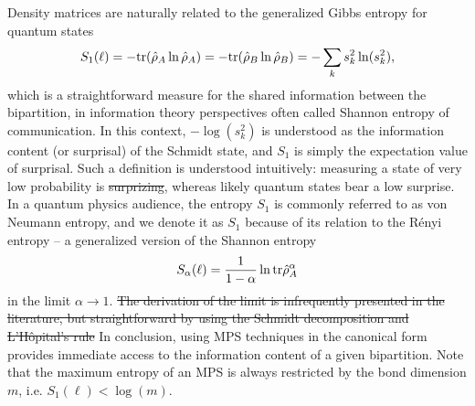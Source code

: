 \documentclass{svmono}
\def\re{\mathrm e}
\def\tr{{\rm tr}}
\providecommand{\DIFaddtex}[1]{{\protect\color{blue}\uwave{#1}}} %
\providecommand{\DIFdeltex}[1]{{\protect\color{red}\sout{#1}}}                      %
\providecommand{\DIFaddbegin}{} %
\providecommand{\DIFaddend}{} %
\providecommand{\DIFdelbegin}{} %
\providecommand{\DIFdelend}{} %
\providecommand{\DIFadd}[1]{\texorpdfstring{\DIFaddtex{#1}}{#1}} %
\providecommand{\DIFdel}[1]{\texorpdfstring{\DIFdeltex{#1}}{}} %
\newcommand{\DIFscaledelfig}{0.5}
\newlength{\DIFdelgraphicswidth} %
\newlength{\DIFdelgraphicsheight} %
\newcommand{\DIFaddincludegraphics}[2][]{{\color{blue}\fbox{\DIFOincludegraphics[#1]{#2}}}} %
\newcommand{\DIFdelincludegraphics}[2][]{%
\sbox{\DIFdelgraphicsbox}{\DIFOincludegraphics[#1]{#2}}%
\settoboxwidth{\DIFdelgraphicswidth}{\DIFdelgraphicsbox} %
\settoboxtotalheight{\DIFdelgraphicsheight}{\DIFdelgraphicsbox} %
\scalebox{\DIFscaledelfig}{%
\parbox[b]{\DIFdelgraphicswidth}{\usebox{\DIFdelgraphicsbox}\\[-\baselineskip] \rule{\DIFdelgraphicswidth}{0em}}\llap{\resizebox{\DIFdelgraphicswidth}{\DIFdelgraphicsheight}{%
\setlength{\unitlength}{\DIFdelgraphicswidth}%
\begin{picture}(1,1)%
\thicklines\linethickness{2pt} %
{\color[rgb]{1,0,0}\put(0,0){\framebox(1,1){}}}%
{\color[rgb]{1,0,0}\put(0,0){\line( 1,1){1}}}%
{\color[rgb]{1,0,0}\put(0,1){\line(1,-1){1}}}%
\end{picture}%
}\hspace*{3pt}}} %
} %
\DeclareRobustCommand{\DIFaddbegin}{\DIFOaddbegin \let\includegraphics\DIFaddincludegraphics} %
\DeclareRobustCommand{\DIFaddend}{\DIFOaddend \let\includegraphics\DIFOincludegraphics} %
\DeclareRobustCommand{\DIFdelbegin}{\DIFOdelbegin \let\includegraphics\DIFdelincludegraphics} %
\DeclareRobustCommand{\DIFdelend}{\DIFOaddend \let\includegraphics\DIFOincludegraphics} %
\begin{document}
Density matrices are naturally related to the generalized Gibbs entropy for quantum states
\DIFdelbegin %
\DIFdelend \DIFaddbegin \begin{align}
    S_1(\ell) = -\tr(\hat\rho_A\ln\hat\rho_A) = -\tr(\hat\rho_B\ln\hat\rho_B) = -\sum_k s^2_k\ln(s^2_k),
\end{align}\DIFaddend 
which is a straightforward measure for the shared information between the bipartition, in information theory perspectives often called Shannon entropy of communication.
In this context, \DIFdelbegin \DIFdel{$-\log(s^2_k)$ }\DIFdelend \DIFaddbegin \DIFadd{$-\ln(s^2_k)$ }\DIFaddend is understood as the information content (or surprisal) of the Schmidt state, and $S_1$ is simply the expectation value of surprisal.
Such a definition is understood intuitively: measuring a state of very low probability is \DIFdelbegin \DIFdel{surprizing}\DIFdelend \DIFaddbegin \DIFadd{surprising}\DIFaddend , whereas likely quantum states bear a low surprise.
In a quantum physics audience, the entropy $S_1$ is commonly referred to as von Neumann entropy, and we denote it as $S_1$ because of its relation to the Rényi entropy -- a generalized version of the Shannon entropy
\DIFdelbegin %
\DIFdelend \DIFaddbegin \begin{align}
    S_\alpha(\ell) = \frac{1}{1-\alpha}\ln\tr\hat\rho^\alpha_A
\end{align}\DIFaddend 
in the limit $\alpha\rightarrow1$.
\DIFdelbegin \DIFdel{The derivation of the limit is infrequently presented in the literature, but straightforward by using the Schmidt decomposition and L'Hôpital's rule
}%
\DIFdelend In conclusion, using MPS techniques in the canonical form provides immediate access to the information content of a given bipartition.
Note that the maximum entropy of an MPS is always restricted by the bond dimension $m$, i.e. \DIFdelbegin \DIFdel{$S_1(\ell)<\log(m)$}\DIFdelend \DIFaddbegin \DIFadd{$S_1(\ell)<\ln(m)$}\DIFaddend .
\end{document}

